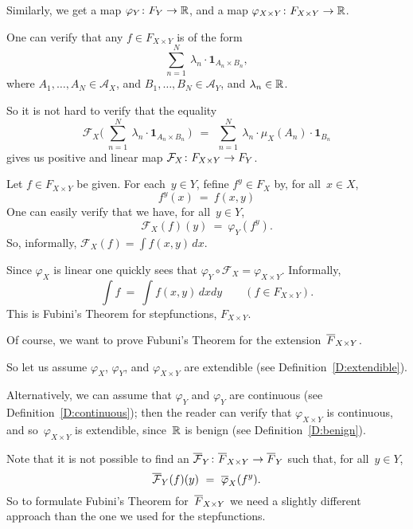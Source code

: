\documentclass[main.tex]{subfiles}
\begin{document}
Similarly, we get
a map $\varphi_Y \colon F_Y \rightarrow \mathbb{R}$,
and a map $\varphi_{X\times Y} \colon F_{X\times Y} \rightarrow \mathbb{R}$.

One can verify that any $f\in F_{X\times Y}$
is of the form
\begin{equation*}
\textstyle{\sum_{n=1}^N} \ \lambda_n \cdot\mathbf{1}_{A_n \times B_n},
\end{equation*}
where $A_1,\dotsc,A_N\in \mathcal{A}_X$,
and $B_1,\dotsc,B_N\in\mathcal{A}_Y$,
and $\lambda_n \in \mathbb{R}$.

So it is not hard to verify that the  equality
\begin{equation*}
\mathcal{F}_X \bigl(\ 
\textstyle{\sum_{n=1}^N} \ \lambda_n \cdot\mathbf{1}_{A_n \times B_n}\ \bigr)
\ \ =\ \ 
\textstyle{\sum_{n=1}^N} \ \lambda_n \cdot \mu_X(A_n) \cdot \mathbf{1}_{B_n}
\end{equation*}
gives us positive and linear map 
$\mathcal{F}_X \colon F_{X\times Y} \rightarrow F_Y$.

Let $f\in F_{X\times Y}$ be given.
For each~$y\in Y$,
fefine $f^y\in F_X$ by, for all~$x\in X$,
\begin{equation*}
f^y(x) \ =\  f(x,y)
\end{equation*}
One can easily verify that we have, for all~$y\in Y$,
\begin{equation*}
\mathcal{F}_X (f) (y)\ =\ \varphi_Y (f^y).
\end{equation*}
So, informally, $\mathcal{F}_{X}(f) = \int f(x,y)\,dx$.

Since $\varphi_X$ is linear
one quickly sees that $\varphi_Y \circ \mathcal{F}_X = \varphi_{X\times Y}$.
Informally,
\begin{equation*}
\int f \ =\ \int f(x,y)\, dx dy\qquad(f\in F_{X\times Y}).
\end{equation*}
This is Fubini's Theorem for stepfunctions, $F_{X\times Y}$.

Of course, we want to prove
Fubuni's Theorem
for the extension~$\overline{F}_{X\times Y}$.

So let us assume
$\varphi_X$, $\varphi_Y$, and $\varphi_{X\times Y}$ are extendible
(see Definition~\ref{D:extendible}).

Alternatively,
we can assume that 
$\varphi_Y$ and $\varphi_Y$
are continuous (see Definition~\ref{D:continuous});
then the reader can verify that
 $\varphi_{X\times Y}$ is continuous,
and so~$\varphi_{X\times Y}$ is extendible,
since~$\mathbb{R}$ is benign (see Definition~\ref{D:benign}).

Note that it is not possible to find 
an $\overline{\mathcal{F}}_{Y}\colon \overline{F}_{X\times Y} \rightarrow \overline{F}_Y$
such that, for all~$y\in Y$,
\begin{equation*}
\overline{\mathcal{F}}_Y(f)(y) \ = \  \overline{\varphi}_X(f^y).
\end{equation*}
So to formulate Fubini's Theorem for~$\overline{F}_{X\times Y}$
we need a slightly different approach than
the one we used for the stepfunctions.
\end{document}
